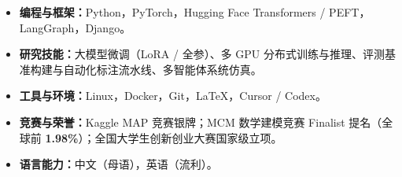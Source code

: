 \documentclass[11pt,a4paper]{article}
\newcommand{\metric}[1]{\textbf{#1}}
\begin{document}
\begin{itemize}
  \item \textbf{编程与框架：}Python，PyTorch，Hugging Face Transformers / PEFT，LangGraph，Django。
  \item \textbf{研究技能：}大模型微调（LoRA / 全参）、多 GPU 分布式训练与推理、评测基准构建与自动化标注流水线、多智能体系统仿真。
  \item \textbf{工具与环境：}Linux，Docker，Git，LaTeX，Cursor / Codex。
  \item \textbf{竞赛与荣誉：}Kaggle MAP 竞赛银牌；MCM 数学建模竞赛 Finalist 提名（全球前 \metric{1.98\%}）；全国大学生创新创业大赛国家级立项。
  \item \textbf{语言能力：}中文（母语），英语（流利）。
\end{itemize}
\end{document}
